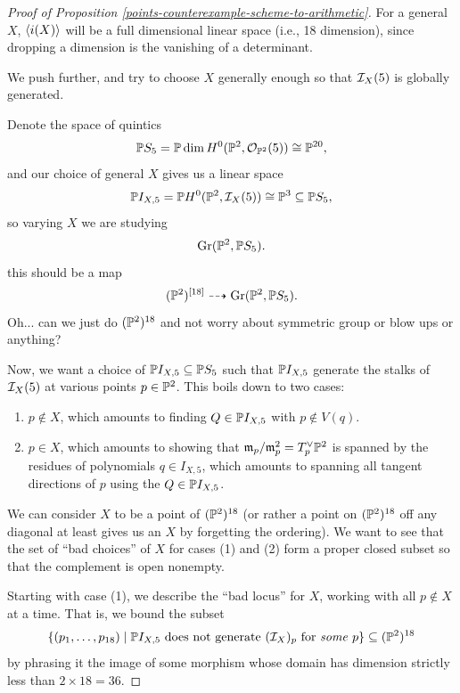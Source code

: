 \documentclass[12pt]{article}
\newcommand{\Gr}{\mathrm{Gr}}
\begin{document}
\begin{itemize}
\begin{proof}[Proof of Proposition \ref{points-counterexample-scheme-to-arithmetic}]
        For a general $X$, $\<i(X)\>$ will be a full dimensional linear space (i.e., 18 dimension), since dropping a dimension is the vanishing of a determinant.

        We push further, and try to choose $X$ generally enough so that $\cI_X(5)$ is globally generated.

        Denote the space of quintics
        \[\P S_5 = \P \dim H^0(\P^2, \cO_{\P^2}(5)) \cong \P^{20},\]
        and our choice of general $X$ gives us a linear space
        \[\P I_{X,5} = \P H^0(\P^2, \cI_X(5)) \cong \P^3 \subseteq \P S_5,\]
        so varying $X$ we are studying
        \[\Gr(\P^2, \P S_5).\]
        {\color{red} this should be a map
        \[(\P^2)^{[18]} \dashrightarrow \Gr(\P^2, \P S_5).\]
        Oh... can we just do $(\P^2)^{18}$ and not worry about symmetric group or blow ups or anything?
        }

        Now, we want a choice of $\P I_{X,5}\subseteq \P S_5$ such that $\P I_{X,5}$ generate the stalks of $\cI_X(5)$ at various points $p\in \P^2$. This boils down to two cases:
        \begin{enumerate}
            \item $p\not\in X$, which amounts to finding $Q\in \P I_{X,5}$ with $p\not\in V(q)$.
            \item $p\in X$, which amounts to showing that $\fm_p/\fm_p^2=T_p^\vee \P^2$ is spanned by the residues of polynomials $q \in I_{X,5}$, which amounts to spanning all tangent directions of $p$ using the $Q\in \P I_{X,5}$.
        \end{enumerate}

        We can consider $X$ to be a point of $(\P^2)^{18}$ (or rather a point on $(\P^2)^{18}$ off any diagonal at least gives us an $X$ by forgetting the ordering). We want to see that the set of ``bad choices'' of $X$ for cases (1) and (2) form a proper closed subset so that the complement is open nonempty.
        
        Starting with case (1), we describe the ``bad locus'' for $X$, working with all $p\not\in X$ at a time. That is, we bound the subset
        \[\{(p_1,\dots,p_{18}) \mid \P I_{X,5} \text{ does not generate $(\cI_X)_p$ for \textit{some} $p$}\} \subseteq (\P^2)^{18}\]
        by phrasing it the image of some morphism whose domain has dimension strictly less than $2\times 18 = 36$.


\end{proof}
\end{itemize}
\end{document}
